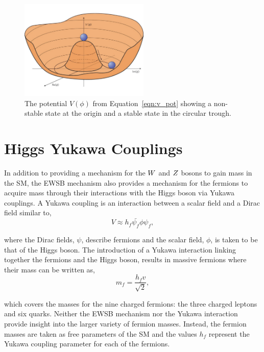\begin{figure}[htbp]
\centering
     \includegraphics[width=0.55\textwidth]{phenomenology_of_processes/plots/higgs_potential.pdf}
     \caption{
The potential $V\left(\phi\right)$ from Equation~\ref{eqn:v_pot} showing a non-stable state
at the origin and a stable state in the circular trough.
     }
     \label{fig:higgs_potential}
\end{figure}



\section{Higgs Yukawa Couplings}
In addition to providing a mechanism for the $W$ and $Z$ bosons to gain mass in the SM, the EWSB mechanism also
provides a mechanism for the fermions to acquire mass through their interactions with the Higgs boson
via Yukawa couplings. A Yukawa coupling is an interaction between a scalar field and a Dirac field
similar to,
\begin{equation}
V \approx h_{f}\bar{\psi_{f}}\phi\psi_{f},
\end{equation}

where the Dirac fields, $\psi$, describe fermions and the scalar field, $\phi$, is taken to be that of the Higgs boson. 
The introduction of a Yukawa interaction linking together the fermions and the Higgs boson,
results in massive fermions where their mass can be written as,
\begin{equation}
m_{f} = \frac{h_{f} v}{\sqrt{2}},
\label{eqn:yukawa_c}
\end{equation}

which covers the masses for the nine charged fermions: the three charged leptons and six quarks.
Neither the EWSB mechanism nor the Yukawa interaction provide insight into the larger variety of fermion
masses. Instead, the fermion masses are taken as free parameters of the SM and the values
$h_{f}$ represent the Yukawa coupling parameter for each of the fermions.

